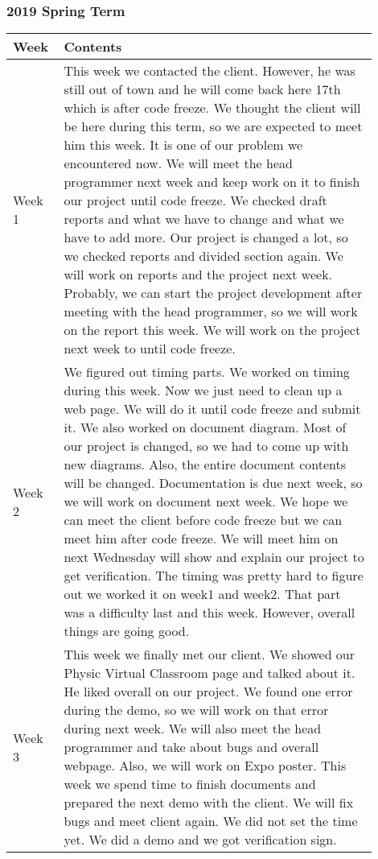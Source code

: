 \documentclass[10pt]{article}
\begin{document}
        \subsubsection{2019 Spring Term}
            \begin{center}
            \begin{tabular}{ | p{0.1\linewidth} | p{0.8\linewidth} | } \hline
                Week & Contents  \\ \hline
                Week 1 & This week we contacted the client. However, he was still out of town and he will come back here 17th which is after code freeze. We thought the client will be here during this term, so we are expected to meet him this week. It is one of our problem we encountered now. We will meet the head programmer next week and keep work on it to finish our project until code freeze. We checked draft reports and what we have to change and what we have to add more. Our project is changed a lot, so we checked reports and divided section again. We will work on reports and the project next week. Probably, we can start the project development after meeting with the head programmer, so we will work on the report this week. We will work on the project next week to until code freeze.     \\ \hline
                Week 2 & We figured out timing parts. We worked on timing during this week. Now we just need to clean up a web page. We will do it until code freeze and submit it. We also worked on document diagram. Most of our project is changed, so we had to come up with new diagrams. Also, the entire document contents will be changed. Documentation is due next week, so we will work on document next week.  We hope we can meet the client before code freeze but we can meet him after code freeze. We will meet him on next Wednesday will show and explain our project to get verification. The timing was pretty hard to figure out we worked it on week1 and week2. That part was a difficulty last and this week. However, overall things are going good. \\ \hline
                Week 3 & This week we finally met our client. We showed our Physic Virtual Classroom page and talked about it. He liked overall on our project. We found one error during the demo, so we will work on that error during next week. We will also meet the head programmer and take about bugs and overall webpage. Also, we will work on Expo poster. This week we spend time to finish documents and prepared the next demo with the client. We will fix bugs and meet client again. We did not set the time yet. We did a demo and we got verification sign.    \\ \hline

\end{tabular}
\end{center}
\end{document}
